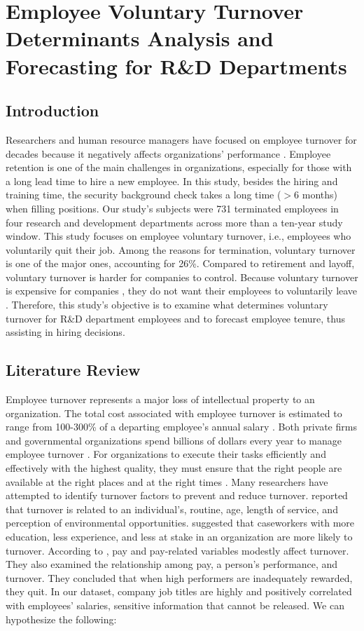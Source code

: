 \chapter{Employee Voluntary Turnover Determinants Analysis and Forecasting for R\&D Departments} \label{ch:4}
\section{Introduction}
Researchers and human resource managers have focused on employee turnover for decades because it negatively affects organizations' performance \citep{shaw2011}. Employee retention is one of the main challenges in organizations, especially for those with a long lead time to hire a new employee. In this study, besides the hiring and training time, the security background check takes a long time ($>6$ months) when filling positions. Our study's subjects were 731 terminated employees in four research and development departments across more than a ten-year study window. This study focuses on employee voluntary turnover, i.e., employees who voluntarily quit their job. Among the reasons for termination, voluntary turnover is one of the major ones, accounting for 26\%. Compared to retirement and layoff, voluntary turnover is harder for companies to control. Because voluntary turnover is expensive for companies \citep{selden2000}, they do not want their employees to voluntarily leave \citep{allen2010}. Therefore, this study's objective is to examine what determines voluntary turnover for R\&D department employees and to forecast employee tenure, thus assisting in hiring decisions. 

\section{Literature Review}
Employee turnover represents a major loss of intellectual property to an organization. The total cost associated with employee turnover is estimated to range from 100-300\% of a departing employee's annual salary \citep{Moody2000}. Both private firms and governmental organizations spend billions of dollars every year to manage employee turnover \citep{leonard2001}. For organizations to execute their tasks efficiently and effectively with the highest quality, they must ensure that the right people are available at the right places and at the right times \citep{khoong1996}. 
Many researchers have attempted to identify turnover factors to prevent and reduce turnover. \citet{bluedorn1982} reported that turnover is related to an individual's, routine, age, length of service, and perception of environmental opportunities. \citet{balfour1993} suggested that caseworkers with more education, less experience, and less at stake in an organization are more likely to turnover. According to \citet{griffeth2000}, pay and pay-related variables modestly affect turnover. They also examined the relationship among pay, a person's performance, and turnover. They concluded that when high performers are inadequately rewarded, they quit. In our dataset, company job titles are highly and positively correlated with employees' salaries, sensitive information that cannot be released. We can hypothesize the following:

